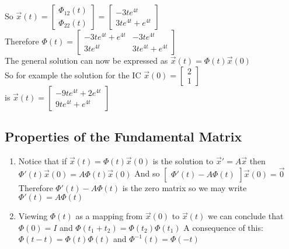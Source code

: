 \documentclass[12pt]{article}
\begin{document}
	So $\overrightarrow{x}(t) = \begin{bmatrix}
	\Phi_{12}(t) \\ \Phi_{22}(t)
	\end{bmatrix} = \begin{bmatrix} -3te^{4t} \\ 3te^{4t} + e^{4t} \end{bmatrix}$\\
	
	Therefore $\Phi(t) = \begin{bmatrix} -3te^{4t} + e^{4t} & -3te^{4t} \\ 3te^{4t} & 3te^{4t}+e^{4t} \end{bmatrix}$\\
	
	The general solution can now be expressed as $\overrightarrow{x}(t) = \Phi(t)\overrightarrow{x}(0)$\\
	
	So for example the solution for the IC $\overrightarrow{x}(0) = \begin{bmatrix}2 \\ 1 \end{bmatrix}$\\
	is $\overrightarrow{x}(t) = \begin{bmatrix} -9te^{4t} + 2e^{4t} \\ 9te^{4t} + e^{4t} \end{bmatrix}$\\
	
	\subsection*{Properties of the Fundamental Matrix}
	\begin{enumerate}
		\item Notice that if $\overrightarrow{x}(t) = \Phi(t)\overrightarrow{x}(0)$ is the solution to $\overrightarrow{x}' = A\overrightarrow{x}$ then $\Phi '(t)\overrightarrow{x}(0) = A\Phi(t)\overrightarrow{x}(0)$ And so $\begin{bmatrix}
		\Phi '(t) - A\Phi(t) \end{bmatrix} \overrightarrow{x}(0) = \overrightarrow{0}$\\
		Therefore $\Phi '(t) - A\Phi(t)$ is the zero matrix so we may write $\Phi '(t) = A\Phi(t)$
		\item Viewing $\Phi(t)$ as a mapping from $\overrightarrow{x}(0)$ to $\overrightarrow{x}(t)$ we can conclude that $\Phi(0) = I$ and $\Phi (t_1 + t_2) = \Phi (t_2)\Phi(t_1)$ A consequence of this: $\Phi(t - t) = \Phi(t) \Phi(t)$ and $\Phi^{-1}(t) = \Phi(-t)$\\
	\end{enumerate}
	
\end{document}
